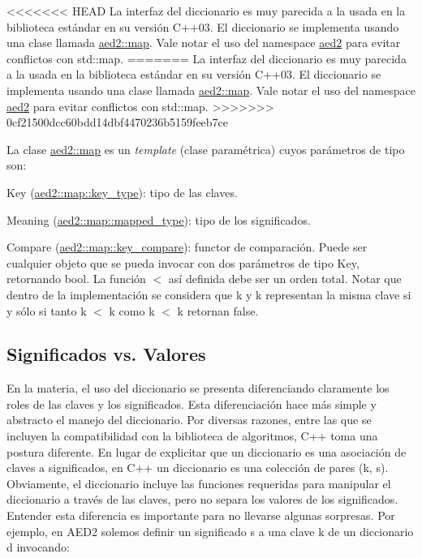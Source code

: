 <<<<<<< HEAD
\-La interfaz del diccionario es muy parecida a la usada en la biblioteca estándar en su versión \-C++03. \-El diccionario se implementa usando una clase llamada \hyperlink{classaed2_1_1map}{aed2\-::map}. \-Vale notar el uso del namespace \hyperlink{namespaceaed2}{aed2} para evitar conflictos con std\-::map.
=======
La interfaz del diccionario es muy parecida a la usada en la biblioteca estándar en su versión C++03. El diccionario se implementa usando una clase llamada \hyperlink{classaed2_1_1map}{aed2\+::map}. Vale notar el uso del namespace \hyperlink{namespaceaed2}{aed2} para evitar conflictos con std\+::map.
>>>>>>> 0cf21500dcc60bdd14dbf4470236b5159feeb7ce

La clase \hyperlink{classaed2_1_1map}{aed2\+::map} es un {\itshape template} (clase paramétrica) cuyos parámetros de tipo son\+:
\begin{DoxyItemize}
\item Key (\hyperlink{classaed2_1_1map_a4273e8812e7105a618df58a2c8b72b7d_a4273e8812e7105a618df58a2c8b72b7d}{aed2\+::map\+::key\+\_\+type})\+: tipo de las claves.
\item Meaning (\hyperlink{classaed2_1_1map_aa3e34bf624f3009884a71b18f4ddae40_aa3e34bf624f3009884a71b18f4ddae40}{aed2\+::map\+::mapped\+\_\+type})\+: tipo de los significados.
\item Compare (\hyperlink{classaed2_1_1map_a3efa081d3379ab76f33a5ef9fe697523_a3efa081d3379ab76f33a5ef9fe697523}{aed2\+::map\+::key\+\_\+compare})\+: functor de comparación. Puede ser cualquier objeto que se pueda invocar con dos parámetros de tipo Key, retornando {\ttfamily bool}. La función $<$ así definida debe ser un orden total. Notar que dentro de la implementación se considera que {\ttfamily k} y {\ttfamily k\textquotesingle{}} representan la misma clave si y sólo si tanto {\ttfamily k} $<$ {\ttfamily k\textquotesingle{}} como {\ttfamily k\textquotesingle{}} $<$ {\ttfamily k} retornan {\ttfamily false}.
\end{DoxyItemize}\hypertarget{Interfaz_Diferencias}{}\subsection{Significados vs. Valores}\label{Interfaz_Diferencias}
En la materia, el uso del diccionario se presenta diferenciando claramente los roles de las claves y los significados. Esta diferenciación hace más simple y abstracto el manejo del diccionario. Por diversas razones, entre las que se incluyen la compatibilidad con la biblioteca de algoritmos, C++ toma una postura diferente. En lugar de explicitar que un diccionario es una asociación de claves a significados, en C++ un diccionario es una colección de pares {\ttfamily (k, s)}. Obviamente, el diccionario incluye las funciones requeridas para manipular el diccionario a través de las claves, pero no separa los valores de los significados. Entender esta diferencia es importante para no llevarse algunas sorpresas. Por ejemplo, en A\+E\+D2 solemos definir un significado {\ttfamily s} a una clave {\ttfamily k} de un diccionario {\ttfamily d} invocando\+: 
